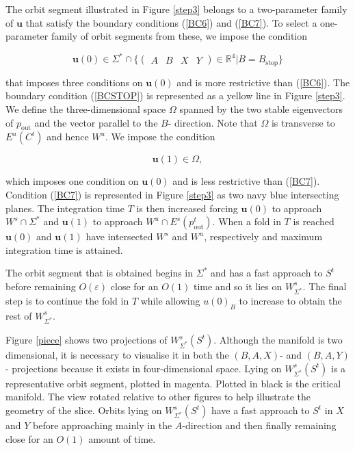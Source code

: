 \documentclass{ws-ijbc}
\begin{document}
The orbit segment illustrated in Figure \ref{step3} belongs to a two-parameter family of $\mathbf{u}$ that satisfy the boundary conditions (\ref{BC6}) and (\ref{BC7}).  To select a one-parameter family of orbit segments from these, we impose the condition
    
    
\begin{equation}
\mathbf{u}(0) \in \Sigma^*\cap \{ \begin{pmatrix} A & B & X & Y \end{pmatrix} \in \mathbb{R}^4 | B = B_{\text{stop}}\}
\label{BCSTOP}
\end{equation}
    
\noindent
that imposes three conditions on $\mathbf{u}(0)$ and is more restrictive than (\ref{BC6}).  The boundary condition (\ref{BCSTOP}) is represented as a yellow line in Figure \ref{step3}.  We define the three-dimensional space $\Omega$ spanned by the two stable eigenvectors of $p_{\text{out}}$ and the vector parallel to the $B$- direction.  Note that $\Omega$ is transverse to $E^u(C^t)$ and hence $W^u$.  We impose the condition
    
\begin{equation}
\mathbf{u}(1) \in \Omega,
\label{BC11}
\end{equation}
    
\noindent
which imposes one condition on $\mathbf{u}(0)$ and is less restrictive than (\ref{BC7}).  Condition (\ref{BC7}) is represented in Figure \ref{step3} as two navy blue intersecting planes.  The integration time $T$ is then increased forcing $\mathbf{u}(0)$ to approach $W^s \cap \Sigma^*$ and $\mathbf{u}(1)$ to approach $W^u \cap E^s(p^t_{\text{out}})$. When a fold in $T$ is reached $\mathbf{u}(0)$ and $\mathbf{u}(1)$ have intersected $W^s$ and $W^u$, respectively and maximum integration time is attained.  
    
The orbit segment that is obtained begins in $\Sigma^*$ and has a fast approach to $S^t$ before remaining $O(\varepsilon)$ close for an $O(1)$ time and so it lies on $W^{s}_{\Sigma^*}$.
    The final step is to continue the fold in $T$ while allowing $u(0)_B$ to increase to obtain the rest of $W^{s}_{\Sigma^*}$.  
    
Figure \ref{piece} shows two projections of $W^s_{\Sigma^*}(S^t)$.  Although the manifold is two dimensional, it is necessary to visualise it in both the $(B,A,X)$- and $(B,A,Y)$- projections because it exists in four-dimensional space.  Lying on $W^s_{\Sigma^*}(S^t)$ is a representative orbit segment, plotted in magenta.  Plotted in black is the critical manifold.  The view rotated relative to other figures to help illustrate the geometry of the slice.  Orbits lying on $W^s_{\Sigma^*}(S^t)$ have a fast approach to $S^t$ in $X$ and $Y$ before approaching mainly in the $A$-direction and then finally remaining close for an $O(1)$ amount of time.
\end{document}
